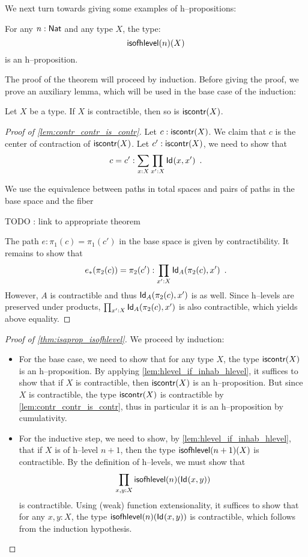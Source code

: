 We next turn towards giving some examples of h--propositions:

\begin{thm}\label{thm:isaprop_isofhlevel}
 For any $n : \Nat$ and any type $X$, the type:
 \[ \isofhlevel(n)(X) \]
 is an h--proposition.
\end{thm}
The proof of the theorem will proceed by induction. Before giving the proof, we 
prove an auxiliary lemma, which will be used in the base case of the induction:

\begin{lem}\label{lem:contr_contr_is_contr}
  Let $X$ be a type. If $X$ is contractible, then so is $\iscontr(X)$.
\end{lem}

\begin{proof}[Proof of \autoref{lem:contr_contr_is_contr}]
 Let $c : \iscontr(X)$. We claim that $c$ is the center of contraction of $\iscontr (X)$.
  Let $c' : \iscontr (X)$, we need to show that 
       \[ c = c' : \sum_{x:X}\prod_{x':X}\idtype{x}{x'} \enspace . \]

 We use the equivalence between paths in total spaces and pairs of paths in the base space and the fiber
 
 TODO : link to appropriate theorem

 The path $e : \pi_1(c) = \pi_1 (c')$ in the base space is given by contractibility.
 It remains to show that 
 \[ \trans{e}{\pi_2(c)} = \pi_2 (c') : \prod_{x' : X} \idtype[A]{\pi_2 (c)} {x'} \enspace .  \]
 However, $A$ is contractible and thus $\idtype[A]{\pi_2 (c)} {x'}$ is as well. 
 Since h--levels are preserved under products, $\prod_{x' : X} \idtype[A]{\pi_2 (c)} {x'}$
 is also contractible, which yields above equality.
\end{proof}

\begin{proof}[Proof of \autoref{thm:isaprop_isofhlevel}]
  We proceed by induction:
 \begin{itemize}
  \item For the base case, we need to show that for any type $X$, the type $\iscontr(X)$ is an
        h--proposition. By applying \autoref{lem:hlevel_if_inhab_hlevel}, it suffices to show that
        if $X$ is contractible, then $\iscontr(X)$ is an h--proposition.
        But since $X$ is contractible, the type $\iscontr(X)$ is contractible by \autoref{lem:contr_contr_is_contr}, 
          thus in particular it is an h--proposition by cumulativity.
  \item For the inductive step, we need to show, by \autoref{lem:hlevel_if_inhab_hlevel}, that if
        $X$ is of h--level $n+1$, then the type $\isofhlevel(n+1)(X)$ is contractible.
        By the definition of h--levels, we must show that
     \[  \prod_{x,y:X} \isofhlevel(n)(\idtype{x}{y}) \]
    is contractible. Using (weak) function extensionality, it suffices to show that for any $x,y : X$, 
     the type $\isofhlevel(n)(\idtype{x}{y})$ is contractible, which follows from the induction hypothesis.

 \end{itemize}

 
\end{proof}


